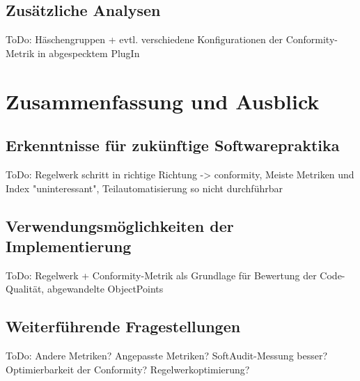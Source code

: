 \documentclass[da,ngerman]{stthesis}
\begin{document}
  		\section{Zusätzliche Analysen}
  			ToDo: Häschengruppen + evtl. verschiedene Konfigurationen der Conformity-Metrik in abgespecktem PlugIn
  		
  	\chapter{Zusammenfassung und Ausblick}	
		\section{Erkenntnisse für zukünftige Softwarepraktika}
			ToDo: Regelwerk schritt in richtige Richtung -> conformity, Meiste Metriken und Index "uninteressant", Teilautomatisierung so nicht durchführbar
		\section{Verwendungsmöglichkeiten der Implementierung}
			ToDo: Regelwerk + Conformity-Metrik als Grundlage für Bewertung der Code-Qualität, abgewandelte ObjectPoints
		\section{Weiterführende Fragestellungen}
			ToDo: Andere Metriken? Angepasste Metriken? SoftAudit-Messung besser? Optimierbarkeit der Conformity? Regelwerkoptimierung? 		
  		
  	\backmatter
  
  	\appendix
  	
  
\end{document}
